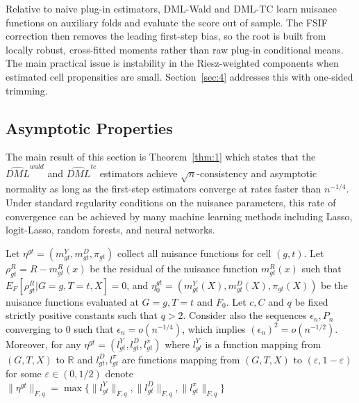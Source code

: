Relative to naive plug-in estimators, DML-Wald and DML-TC learn nuisance functions on auxiliary folds and evaluate the score out of sample. The FSIF correction then removes the leading first-step bias, so the root is built from locally robust, cross-fitted moments rather than raw plug-in conditional means. The main practical issue is instability in the Riesz-weighted components when estimated cell propensities are small. Section~\ref{sec:4} addresses this with one-sided trimming.

\subsection{Asymptotic Properties}\label{sec:3e}

The main result of this section is Theorem~\ref{thm:1} which states that the $\widehat{DML}^{wald}$ and $\widehat{DML}^{tc}$ estimators achieve $\sqrt{n}$-consistency and asymptotic normality as long as the first-step estimators converge at rates faster than $n^{-1/4}$. Under standard regularity conditions on the nuisance parameters, this rate of convergence can be achieved by many machine learning methods including Lasso, logit-Lasso, random forests, and neural networks.

Let $\eta^{gt} = (m^Y_{gt}, m^D_{gt}, \pi_{gt})$ collect all nuisance functions for cell $(g,t)$. Let $\rho^R_{gt}=R-m^R_{gt}(x)$ be the residual of the nuisance function $m^R_{gt}(x)$ such that $E_{F}[\rho^R_{gt}|G=g, T=t, X]=0$, and $\eta^{gt}_0=(m^Y_{gt}(X),m^D_{gt}(X),\pi_{gt}(X))$ be the nuisance functions evaluated at $G=g,T=t$ and $F_0$. Let $c, C$ and $q$ be fixed strictly positive constants such that $q>2$. Consider also the sequences $\epsilon_n, P_n$ converging to $0$ such that $\epsilon_n = o(n^{-1/4})$, which implies $(\epsilon_n)^2 = o(n^{-1/2})$. Moreover, for any $\eta^{gt}=(l^{Y}_{gt}, l^{D}_{gt}, l^{\pi}_{{gt}})$ where $l^{Y}_{gt}$ is a function mapping from $(G,T,X)$ to $\mathbb{R}$ and $l^{D}_{gt}, l^{\pi}_{{gt}}$ are functions mapping from $(G,T,X)$ to $(\varepsilon, 1-\varepsilon)$ for some $\varepsilon \in (0,1/2)$ denote $\| \eta^{gt} \|_{F,q} = \max \{ \| l^Y_{gt} \|_{F,q}, \| l^D_{gt} \|_{F,q}, \| l^{\pi}_{gt} \|_{F,q} \}
$\\

